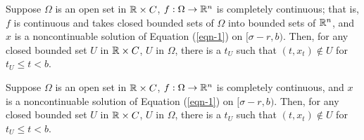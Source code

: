 \begin{theorem}
  Suppose $\Omega$ is an open set in $\mathbb{R}\times C$, $f:\Omega\to \mathbb{R}^{n}$ is completely continuous; that is, $f$ is continuous and takes closed bounded sets of $\Omega$ into bounded sets of $\mathbb{R}^{n}$, and $x$ is a noncontinuable solution of Equation {\normalfont (\ref{eqn-1})} on $[\sigma-r,b)$. Then, for any closed bounded set $U$ in $\mathbb{R}\times C$, $U$ in $\Omega$, there is a $t_U$ such that $(t,x_t)\notin  U$ for $t_U\le t<b$.
\end{theorem}

\begin{theorem}
  Suppose $\Omega$ is an open set in $\mathbb{R}\times C$, $f:\Omega\to \mathbb{R}^{n}$ is completely continuous, and $x$ is a noncontinuable solution of Equation {\normalfont(\ref{eqn-1})} on $[\sigma-r,b)$. Then, for any closed bounded set $U$ in $\mathbb{R}\times C$, $U$ in $\Omega$, there is a $t_U$ such that $(t,x_t)\notin U$ for $t_U\le t<b$.
\end{theorem}


